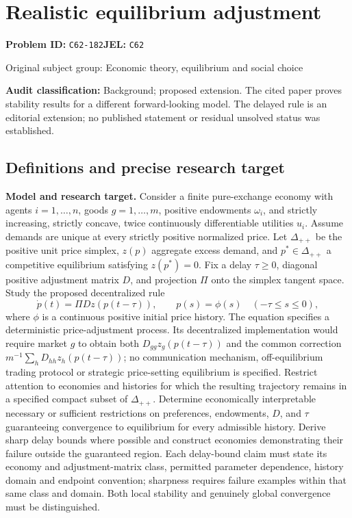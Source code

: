 \documentclass[11pt,a4paper]{article}
\begin{document}
\section*{Realistic equilibrium adjustment}
\textbf{Problem ID:} \texttt{C62-182}\quad \textbf{JEL:} \texttt{C62}\par
\label{problem:OP-0271}
{\sffamily\small\color{muted}Original subject group: Economic theory, equilibrium and social choice\par}
\label{definitions:problem:30007552}
\textbf{Audit classification:} Background; proposed extension. The cited paper proves stability results for a different forward-looking model. The delayed rule is an editorial extension; no published statement or residual unsolved status was established.
\subsection*{Definitions and precise research target}
\textbf{Model and research target.} Consider a finite pure-exchange economy with agents \(i=1,\ldots,n\), goods \(g=1,\ldots,m\), positive endowments \(\omega_i\), and strictly increasing, strictly concave, twice continuously differentiable utilities \(u_i\). Assume demands are unique at every strictly positive normalized price. Let \(\Delta_{++}\) be the positive unit price simplex, \(z(p)\) aggregate excess demand, and \(p^*\in\Delta_{++}\) a competitive equilibrium satisfying \(z(p^*)=0\). Fix a delay \(\tau\geq0\), diagonal positive adjustment matrix \(D\), and projection \(\Pi\) onto the simplex tangent space. Study the proposed decentralized rule
\[
 \dot p(t)=\Pi D z(p(t-\tau)),\qquad p(s)=\phi(s)\quad(-\tau\leq s\leq0),
\]
where \(\phi\) is a continuous positive initial price history. The equation specifies a deterministic price-adjustment process. Its decentralized implementation would require market \(g\) to obtain both \(D_{gg}z_g(p(t-\tau))\) and the common correction \(m^{-1}\sum_hD_{hh}z_h(p(t-\tau))\); no communication mechanism, off-equilibrium trading protocol or strategic price-setting equilibrium is specified. Restrict attention to economies and histories for which the resulting trajectory remains in a specified compact subset of \(\Delta_{++}\). Determine economically interpretable necessary or sufficient restrictions on preferences, endowments, \(D\), and \(\tau\) guaranteeing convergence to equilibrium for every admissible history. Derive sharp delay bounds where possible and construct economies demonstrating their failure outside the guaranteed region. Each delay-bound claim must state its economy and adjustment-matrix class, permitted parameter dependence, history domain and endpoint convention; sharpness requires failure examples within that same class and domain. Both local stability and genuinely global convergence must be distinguished.
\end{document}
